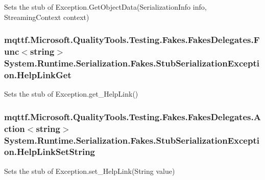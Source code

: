 Sets the stub of Exception.\-Get\-Object\-Data(\-Serialization\-Info info, Streaming\-Context context)

\hypertarget{class_system_1_1_runtime_1_1_serialization_1_1_fakes_1_1_stub_serialization_exception_af95032c2501c6de915a99c4cd3565a65}{
\subsubsection[{Help\-Link\-Get}]{\setlength{\rightskip}{0pt plus 5cm}mqttf.\-Microsoft.\-Quality\-Tools.\-Testing.\-Fakes.\-Fakes\-Delegates.\-Func$<$string$>$ System.\-Runtime.\-Serialization.\-Fakes.\-Stub\-Serialization\-Exception.\-Help\-Link\-Get}}\label{class_system_1_1_runtime_1_1_serialization_1_1_fakes_1_1_stub_serialization_exception_af95032c2501c6de915a99c4cd3565a65}


Sets the stub of Exception.\-get\-\_\-\-Help\-Link()

\hypertarget{class_system_1_1_runtime_1_1_serialization_1_1_fakes_1_1_stub_serialization_exception_ab18f9c17c72fc7d8276f99bc947bc8d7}{
\subsubsection[{Help\-Link\-Set\-String}]{\setlength{\rightskip}{0pt plus 5cm}mqttf.\-Microsoft.\-Quality\-Tools.\-Testing.\-Fakes.\-Fakes\-Delegates.\-Action$<$string$>$ System.\-Runtime.\-Serialization.\-Fakes.\-Stub\-Serialization\-Exception.\-Help\-Link\-Set\-String}}\label{class_system_1_1_runtime_1_1_serialization_1_1_fakes_1_1_stub_serialization_exception_ab18f9c17c72fc7d8276f99bc947bc8d7}


Sets the stub of Exception.\-set\-\_\-\-Help\-Link(\-String value)

